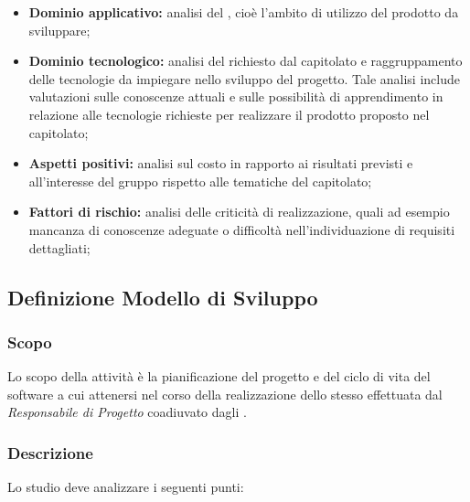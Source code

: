 \documentclass[../NormediProgetto.tex]{subfiles}
\begin{document}
\begin{itemize}
	\item \textbf{Dominio applicativo:} analisi del , cioè l'ambito di utilizzo del prodotto da sviluppare;
	
	\item \textbf{Dominio tecnologico:} analisi del  richiesto dal capitolato e raggruppamento delle tecnologie da impiegare nello sviluppo del progetto. Tale analisi include valutazioni sulle conoscenze attuali e sulle possibilità di apprendimento in relazione alle tecnologie richieste per realizzare il prodotto proposto nel capitolato;
	
	\item \textbf{Aspetti positivi:} analisi sul costo in rapporto ai risultati previsti e all’interesse del gruppo rispetto alle tematiche del capitolato;
	
	\item \textbf{Fattori di rischio:} analisi delle criticità di realizzazione, quali ad esempio mancanza di conoscenze adeguate o difficoltà nell’individuazione di requisiti dettagliati;

\end{itemize}


\subsection{Definizione Modello di Sviluppo}

\subsubsection{Scopo}

Lo scopo della attività è la pianificazione del progetto e del ciclo di vita del software a cui attenersi nel corso della realizzazione dello stesso effettuata dal \textit{Responsabile di Progetto} coadiuvato dagli . 

\subsubsection{Descrizione}

Lo studio deve analizzare i seguenti punti:
\end{document}
